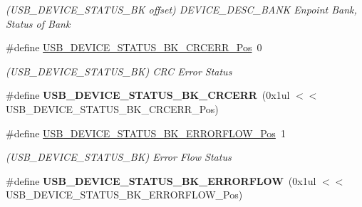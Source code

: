 \begin{DoxyCompactItemize}
\begin{DoxyCompactList}\small\item\em (U\+S\+B\+\_\+\+D\+E\+V\+I\+C\+E\+\_\+\+S\+T\+A\+T\+U\+S\+\_\+\+B\+K offset) D\+E\+V\+I\+C\+E\+\_\+\+D\+E\+S\+C\+\_\+\+B\+A\+N\+K Enpoint Bank, Status of Bank \end{DoxyCompactList}\item 
\hypertarget{group___s_a_m_l21___u_s_b_gad308ade50b904627335d19830484de2d}{}\#define \hyperlink{group___s_a_m_l21___u_s_b_gad308ade50b904627335d19830484de2d}{U\+S\+B\+\_\+\+D\+E\+V\+I\+C\+E\+\_\+\+S\+T\+A\+T\+U\+S\+\_\+\+B\+K\+\_\+\+C\+R\+C\+E\+R\+R\+\_\+\+Pos}~0\label{group___s_a_m_l21___u_s_b_gad308ade50b904627335d19830484de2d}

\begin{DoxyCompactList}\small\item\em (U\+S\+B\+\_\+\+D\+E\+V\+I\+C\+E\+\_\+\+S\+T\+A\+T\+U\+S\+\_\+\+B\+K) C\+R\+C Error Status \end{DoxyCompactList}\item 
\hypertarget{group___s_a_m_l21___u_s_b_ga1237eacf35d6528d918dadba5f9b5efa}{}\#define {\bfseries U\+S\+B\+\_\+\+D\+E\+V\+I\+C\+E\+\_\+\+S\+T\+A\+T\+U\+S\+\_\+\+B\+K\+\_\+\+C\+R\+C\+E\+R\+R}~(0x1ul $<$$<$ U\+S\+B\+\_\+\+D\+E\+V\+I\+C\+E\+\_\+\+S\+T\+A\+T\+U\+S\+\_\+\+B\+K\+\_\+\+C\+R\+C\+E\+R\+R\+\_\+\+Pos)\label{group___s_a_m_l21___u_s_b_ga1237eacf35d6528d918dadba5f9b5efa}

\item 
\hypertarget{group___s_a_m_l21___u_s_b_gac53cf95fda3e0f35814310e07d1a6e71}{}\#define \hyperlink{group___s_a_m_l21___u_s_b_gac53cf95fda3e0f35814310e07d1a6e71}{U\+S\+B\+\_\+\+D\+E\+V\+I\+C\+E\+\_\+\+S\+T\+A\+T\+U\+S\+\_\+\+B\+K\+\_\+\+E\+R\+R\+O\+R\+F\+L\+O\+W\+\_\+\+Pos}~1\label{group___s_a_m_l21___u_s_b_gac53cf95fda3e0f35814310e07d1a6e71}

\begin{DoxyCompactList}\small\item\em (U\+S\+B\+\_\+\+D\+E\+V\+I\+C\+E\+\_\+\+S\+T\+A\+T\+U\+S\+\_\+\+B\+K) Error Flow Status \end{DoxyCompactList}\item 
\hypertarget{group___s_a_m_l21___u_s_b_gac620021896168109190f2454515c0d01}{}\#define {\bfseries U\+S\+B\+\_\+\+D\+E\+V\+I\+C\+E\+\_\+\+S\+T\+A\+T\+U\+S\+\_\+\+B\+K\+\_\+\+E\+R\+R\+O\+R\+F\+L\+O\+W}~(0x1ul $<$$<$ U\+S\+B\+\_\+\+D\+E\+V\+I\+C\+E\+\_\+\+S\+T\+A\+T\+U\+S\+\_\+\+B\+K\+\_\+\+E\+R\+R\+O\+R\+F\+L\+O\+W\+\_\+\+Pos)\label{group___s_a_m_l21___u_s_b_gac620021896168109190f2454515c0d01}


\end{DoxyCompactItemize}
